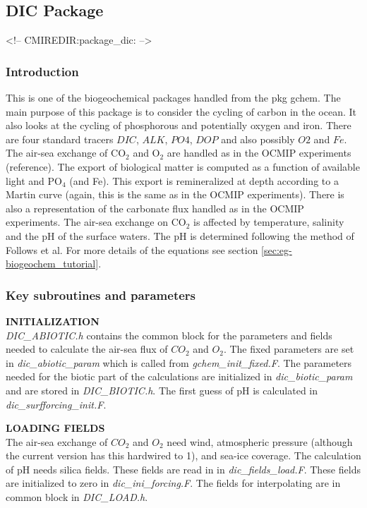 \subsection {DIC Package} 
\label{sec:pkg:dic}
\begin{rawhtml}
<!-- CMIREDIR:package_dic: -->
\end{rawhtml}

\subsubsection {Introduction}
This is one of the biogeochemical packages handled from the
pkg gchem. The main purpose of this package is to consider
the cycling of carbon in the ocean. It also looks at the
cycling of phosphorous and potentially oxygen and iron. 
There are four standard tracers
$DIC$, $ALK$, $PO4$, $DOP$ and also possibly $O2$ and $Fe$. 
The air-sea exchange
of CO$_2$ and O$_2$ are handled as in the OCMIP experiments
(reference). The export of biological matter is computed
as a function of available light and PO$_4$ (and Fe). This export is
remineralized at depth according to a Martin curve (again,
this is the same as in the OCMIP experiments). There is
also a representation of the carbonate flux handled as in
the OCMIP experiments. The air-sea exchange on CO$_2$
is affected by temperature, salinity and the pH of the
surface waters. The pH is determined following the
method of Follows et al. 
For more details of the equations see section 
\ref{sec:eg-biogeochem_tutorial}.

\subsubsection {Key subroutines and parameters}

\noindent
{{\bf INITIALIZATION}} \\
{\it DIC\_ABIOTIC.h} contains the common block for the 
parameters and fields needed to calculate the air-sea
flux of $CO_2$ and $O_2$. The fixed parameters are set in
{\it dic\_abiotic\_param} which is called from {\it gchem\_init\_fixed.F}.
The parameters needed for the biotic part of the calculations
are initialized in {\it dic\_biotic\_param} and are stored
in {\it DIC\_BIOTIC.h}. The first guess of pH is calculated
in {\it dic\_surfforcing\_init.F}.

\vspace{.5cm}

\noindent
{{\bf LOADING FIELDS}}\\
The air-sea exchange of $CO_2$ and $O_2$ need wind, atmospheric
pressure (although the current version has this hardwired to 1),
and sea-ice coverage. The calculation of pH needs silica fields.
These fields are read in in {\it dic\_fields\_load.F}. These
fields are initialized to zero in {\it dic\_ini\_forcing.F}.
The fields for interpolating are in common block in 
{\it DIC\_LOAD.h}.

